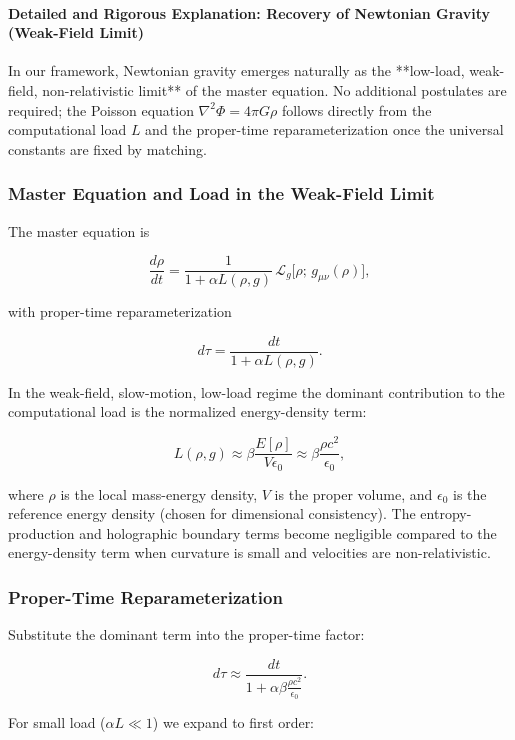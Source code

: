 \documentclass[reprint,amsmath,amssymb,aps,prd,preprintnumbers,superscriptaddress,longbibliography,10pt]{revtex4-2}
\begin{document}
\paragraph{Detailed and Rigorous Explanation: Recovery of Newtonian Gravity (Weak-Field Limit)}

In our framework, Newtonian gravity emerges naturally as the **low-load, weak-field, non-relativistic limit** of the master equation. No additional postulates are required; the Poisson equation $\nabla^2 \Phi = 4\pi G \rho$ follows directly from the computational load $L$ and the proper-time reparameterization once the universal constants are fixed by matching.

\subsubsection{Master Equation and Load in the Weak-Field Limit}

The master equation is

$$
\frac{d\rho}{dt} = \frac{1}{1 + \alpha L(\rho,g)} \,\mathcal{L}_g\bigl[\rho;\, g_{\mu\nu}(\rho)\bigr],
$$

with proper-time reparameterization

$$
d\tau = \frac{dt}{1 + \alpha L(\rho,g)}.
$$

In the weak-field, slow-motion, low-load regime the dominant contribution to the computational load is the normalized energy-density term:

$$
L(\rho,g) \approx \beta \frac{E[\rho]}{V \epsilon_0} \approx \beta \frac{\rho c^2}{\epsilon_0},
$$

where $\rho$ is the local mass-energy density, $V$ is the proper volume, and $\epsilon_0$ is the reference energy density (chosen for dimensional consistency). The entropy-production and holographic boundary terms become negligible compared to the energy-density term when curvature is small and velocities are non-relativistic.

\subsubsection{Proper-Time Reparameterization}

Substitute the dominant term into the proper-time factor:

$$
d\tau \approx \frac{dt}{1 + \alpha \beta \frac{\rho c^2}{\epsilon_0}}.
$$

For small load ($\alpha L \ll 1$) we expand to first order:
\end{document}

